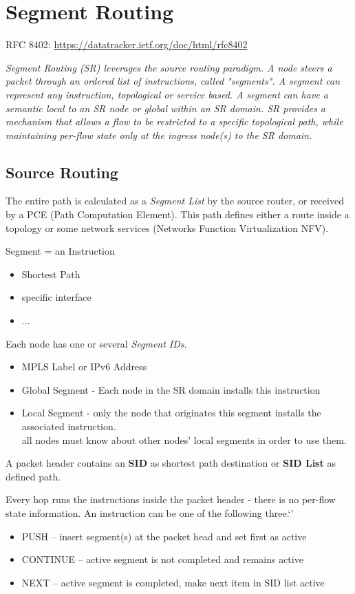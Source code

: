 \section{Segment Routing}

RFC 8402: \url{https://datatracker.ietf.org/doc/html/rfc8402}

\emph{Segment Routing (SR) leverages the source routing paradigm.  A node 
   steers a packet through an ordered list of instructions, called 
   "segments".  A segment can represent any instruction, topological or 
   service based.  A segment can have a semantic local to an SR node or 
   global within an SR domain.  SR provides a mechanism that allows a 
   flow to be restricted to a specific topological path, while 
   maintaining per-flow state only at the ingress node(s) to the SR 
   domain.}

\subsection{Source Routing}
The entire path is calculated as a \emph{Segment List} by the source router, or received by a PCE (Path Computation Element).
This path defines either a route inside a topology or some network services (Networks Function Virtualization NFV).

\noindent
Segment = an Instruction
\begin{itemize}
    \item Shortest Path
    \item specific interface
    \item ...
\end{itemize}

\noindent
Each node has one or several \emph{Segment IDs}. 
\begin{itemize}
    \item MPLS Label or IPv6 Address
    \item Global Segment - Each node in the SR domain installs this instruction
    \item Local Segment - only the node that originates this segment installs the associated instruction. \\
    all nodes must know about other nodes' local segments in order to use them.
\end{itemize}

\noindent
A packet header contains an \textbf{SID} as shortest path destination or \textbf{SID List} as defined path.

\noindent
Every hop runs the instructions inside the packet header - there is no per-flow state information. An instruction can be one of the following three.`'
\begin{itemize}
    \item PUSH -- insert segment(s) at the packet head and set first as active
    \item CONTINUE -- active segment is not completed and remains active
    \item NEXT -- active segment is completed, make next item in SID list active
\end{itemize}


